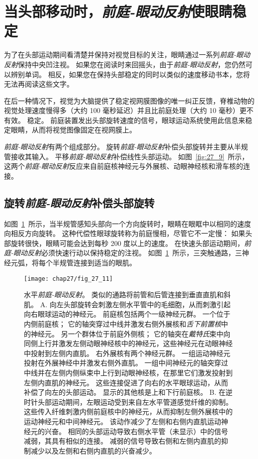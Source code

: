 \section{当头部移动时，\textit{前庭-眼动反射}使眼睛稳定}

为了在头部运动期间看清楚并保持对视觉目标的关注，眼睛通过一系列\textit{前庭-眼动反射}保持中央凹注视。
如果您在阅读时来回摇头，由于\textit{前庭-眼动反射}，您仍然可以辨别单词。
相反，如果您在保持头部稳定的同时以类似的速度移动书本，您将无法再阅读这些文字。


在后一种情况下，视觉为大脑提供了稳定视网膜图像的唯一纠正反馈，脊椎动物的视觉处理速度慢得多（大约 100 毫秒延迟）并且比前庭处理（大约 10 毫秒）更不有效。 稳定。
前庭装置发出头部旋转速度的信号，眼球运动系统使用此信息来稳定眼睛，从而将视觉图像固定在视网膜上。


\textit{前庭-眼动反射}有两个组成部分。
旋转\textit{前庭-眼动反射}补偿头部旋转并主要从半规管接收其输入。
平移\textit{前庭-眼动反射}补偿线性头部运动。
如图~\ref{fig:27_9}~所示，这两个\textit{前庭-眼动反射}反应来自前庭核神经元与外展核、动眼神经核和滑车核的连接。



\subsection{旋转\textit{前庭-眼动反射}补偿头部旋转}

如图~\ref{fig:27_11}~所示，当半规管感知头部向一个方向旋转时，眼睛在眼眶中以相同的速度向相反方向旋转。
这种代偿性眼球旋转称为前庭慢相，尽管它不一定慢：
如果头部旋转很快，眼睛可能会达到每秒 200 度以上的速度。
在快速头部运动期间，\textit{前庭-眼动反射}必须快速行动以保持稳定的注视。
如图~\ref{fig:27_11}~所示，三突触通路，三神经元弧，将每个半规管连接到适当的眼肌。


\begin{figure}[htbp]
	\centering
	\texttt{[image: chap27/fig\_27\_11]}
	\caption{水平\textit{前庭-眼动反射}。
		类似的通路将前管和后管连接到垂直直肌和斜肌。
		A. 向左头部旋转会刺激左侧水平管中的毛细胞，从而刺激引起向右眼球运动的神经元。
		前庭核包括两个一级神经元群。
		一个位于内侧前庭核；
		它的轴突穿过中线并激发右侧外展核和\textit{舌下前置核}中的神经元。
		另一个群体位于前庭外侧核；
		它的轴突在\textit{戴特氏}束中向同侧上行并激发左侧动眼神经核中的神经元，这些神经元在动眼神经中投射到左侧内直肌。
		右外展核有两个神经元群。
		一组运动神经元投射在外展神经中并激发右侧外直肌。
		一组中间神经元的轴突穿过中线并在左侧内侧纵束中上行到动眼神经核，在那里它们激发投射到左侧内直肌的神经元。
		这些连接促进了向右的水平眼球运动，从而补偿了向左的头部运动。
		显示的其他核是上和下行前庭核。
		B. 在逆时针头部运动期间，左眼运动受到来自左水平管道感觉纤维的抑制。
		这些传入纤维刺激内侧前庭核中的神经元，从而抑制左侧外展核中的运动神经元和中间神经元。
		该动作减少了左侧和右侧内直肌运动神经元的兴奋。
		相同的头部运动导致右侧水平管（未显示）中的信号减弱，其具有相似的连接。
		减弱的信号导致右侧和左侧内直肌的抑制减少以及左侧和右侧内直肌的兴奋减少\cite{sugiuchi2005vestibular}。}
	\label{fig:27_11}
\end{figure}


